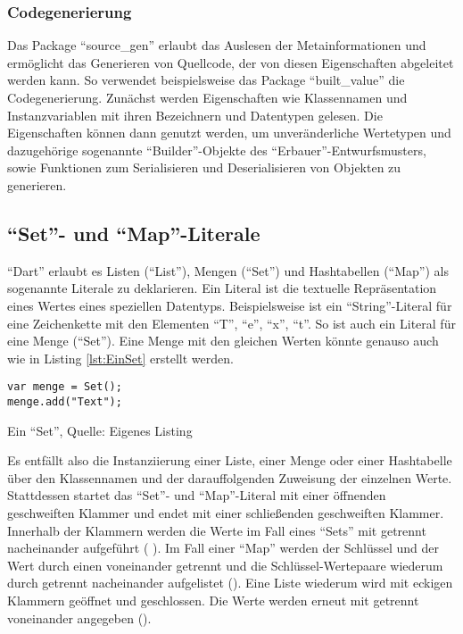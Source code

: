 \subsubsection{Codegenerierung}
Das Package \enquote{source_gen} erlaubt das Auslesen der Metainformationen und ermöglicht das Generieren von Quellcode, der von diesen Eigenschaften abgeleitet werden kann.
So verwendet beispielsweise das Package \enquote{built_value} die Codegenerierung.
Zunächst werden Eigenschaften wie Klassennamen und Instanzvariablen mit ihren Bezeichnern und Datentypen gelesen.
Die Eigenschaften können dann genutzt werden, um unveränderliche Wertetypen und dazugehörige sogenannte \enquote{Builder}-Objekte des \enquote{Erbauer}-Entwurfsmusters, sowie Funktionen zum Serialisieren und Deserialisieren von Objekten zu generieren.

\subsection{\enquote{Set}- und \enquote{Map}-Literale}
\label{sec:SetUndMapLiterale}

\enquote{Dart} erlaubt es Listen (\enquote{List}), Mengen (\enquote{Set}) und Hashtabellen (\enquote{Map}) als sogenannte Literale zu deklarieren.
Ein Literal ist die textuelle Repräsentation eines Wertes eines speziellen Datentyps.
Beispielsweise ist   ein \enquote{String}-Literal für eine Zeichenkette mit den Elementen \enquote{T}, \enquote{e}, \enquote{x}, \enquote{t}.
So ist auch   ein Literal für eine Menge (\enquote{Set}).
Eine Menge mit den gleichen Werten könnte genauso auch wie in Listing \ref{lst:EinSet} erstellt werden.

\ifIncludeFigures
  \begin{listing}[ht]
    \begin{verbatim}
var menge = Set();
menge.add("Text");
\end{verbatim}
    \caption[Ein \enquote{Set}]{Ein \enquote{Set}, Quelle: Eigenes Listing}
    \label{lst:EinSet}
  \end{listing}
\fi

Es entfällt also die Instanziierung einer Liste, einer Menge oder einer Hashtabelle über den Klassennamen und der darauffolgenden Zuweisung der einzelnen Werte.
Stattdessen startet das \enquote{Set}- und \enquote{Map}-Literal mit einer öffnenden geschweiften Klammer und endet mit einer schließenden geschweiften Klammer.
Innerhalb der Klammern werden die Werte im Fall eines \enquote{Sets} mit \IC{,} getrennt nacheinander aufgeführt (  ).
Im Fall einer \enquote{Map} werden der Schlüssel und der Wert durch einen \IC{:} voneinander getrennt und die Schlüssel-Wertepaare wiederum durch \IC{,} getrennt nacheinander aufgelistet ().
Eine Liste wiederum wird mit eckigen Klammern geöffnet und geschlossen.
Die Werte werden erneut mit \IC{,} getrennt voneinander angegeben (\IC{[1,2]}).

